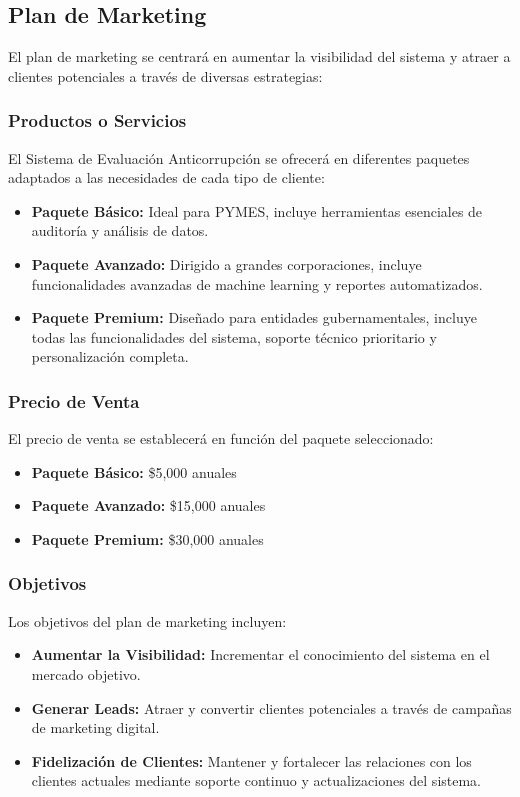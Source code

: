 \documentclass[a4paper,12pt]{article}
\begin{document}
\subsection{Plan de Marketing}
El plan de marketing se centrará en aumentar la visibilidad del sistema y atraer a clientes potenciales a través de diversas estrategias:

\subsubsection{Productos o Servicios}
El Sistema de Evaluación Anticorrupción se ofrecerá en diferentes paquetes adaptados a las necesidades de cada tipo de cliente:

\begin{itemize}
    \item \textbf{Paquete Básico:} Ideal para PYMES, incluye herramientas esenciales de auditoría y análisis de datos.
    \item \textbf{Paquete Avanzado:} Dirigido a grandes corporaciones, incluye funcionalidades avanzadas de machine learning y reportes automatizados.
    \item \textbf{Paquete Premium:} Diseñado para entidades gubernamentales, incluye todas las funcionalidades del sistema, soporte técnico prioritario y personalización completa.
\end{itemize}

\subsubsection{Precio de Venta}
El precio de venta se establecerá en función del paquete seleccionado:

\begin{itemize}
    \item \textbf{Paquete Básico:} \$5,000 anuales
    \item \textbf{Paquete Avanzado:} \$15,000 anuales
    \item \textbf{Paquete Premium:} \$30,000 anuales
\end{itemize}

\subsubsection{Objetivos}
Los objetivos del plan de marketing incluyen:

\begin{itemize}
    \item \textbf{Aumentar la Visibilidad:} Incrementar el conocimiento del sistema en el mercado objetivo.
    \item \textbf{Generar Leads:} Atraer y convertir clientes potenciales a través de campañas de marketing digital.
    \item \textbf{Fidelización de Clientes:} Mantener y fortalecer las relaciones con los clientes actuales mediante soporte continuo y actualizaciones del sistema.
\end{itemize}
\end{document}
